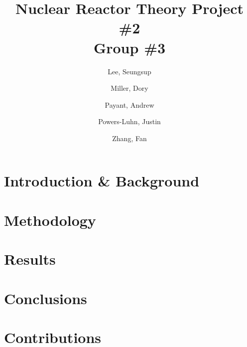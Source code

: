 \documentclass[10pt,peerreviewca]{IEEEtran}
\author{
	Lee, Seungsup
	\and
	Miller, Dory
	\and
	Payant, Andrew
	\and
	Powers-Luhn, Justin
	\and
	Zhang, Fan
}
\title{Nuclear Reactor Theory Project \#2\\Group \#3}
\date{ }
\begin{document}
\maketitle

\section{Introduction \& Background}



\section{Methodology}



\section{Results}



\section{Conclusions}



\section{Contributions}


\end{document}
